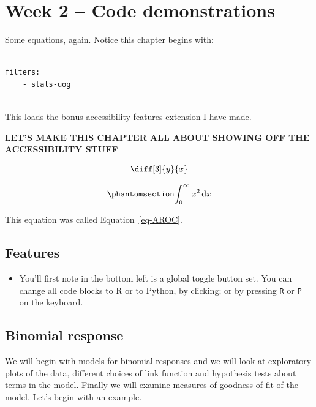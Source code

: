 \documentclass[
  a4paper,
  DIV=11,
  numbers=noendperiod,
  oneside]{scrreport}
\author{}
\date{}
\providecommand{\tightlist}{%
  \setlength{\itemsep}{0pt}\setlength{\parskip}{0pt}}
\newcommand{\dx}{\,\text{d}x}
\begin{document}
\chapter{Week 2 -- Code demonstrations}\label{sec-code-demo}

Some equations, again. Notice this chapter begins with:

\begin{verbatim}
---
filters:
    - stats-uog
---
\end{verbatim}

This loads the bonus accessibility features extension I have made.

\textbf{LET'S MAKE THIS CHAPTER ALL ABOUT SHOWING OFF THE ACCESSIBILITY
STUFF}

\[\diff[3]{y}{x}\]

\begin{equation}\phantomsection\label{eq-AROC}{\int_0^{\infty} x^2 \dx}\end{equation}

This equation was called Equation~\ref{eq-AROC}.

\section{Features}\label{features}

\begin{itemize}
\tightlist
\item
  You'll first note in the bottom left is a global toggle button set.
  You can change all code blocks to R or to Python, by clicking; or by
  pressing \texttt{R} or \texttt{P} on the keyboard.
\end{itemize}

\section{Binomial response}\label{binomial-response}

We will begin with models for binomial responses and we will look at
exploratory plots of the data, different choices of link function and
hypothesis tests about terms in the model. Finally we will examine
measures of goodness of fit of the model. Let's begin with an example.
\end{document}
